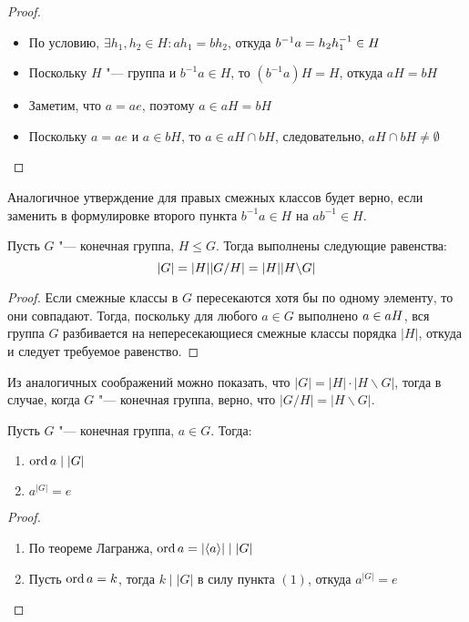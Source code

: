 \begin{proof}~
	\begin{itemize}
		\item{} По условию, $\exists h_1, h_2 \in H: ah_1 = bh_2$, откуда $b^{-1}a \hm= h_2h_1^{-1} \in H$
		\item{} Поскольку $H$ "--- группа и $b^{-1}a \in H$, то $(b^{-1}a)H = H$, откуда $aH = bH$
		\item{} Заметим, что $a = ae$, поэтому $a \in aH = bH$
		\item{} Поскольку $a = ae$ и $a \in bH$, то $a \in aH \cap bH$, следовательно, $aH \cap bH \ne \emptyset$\qedhere
	\end{itemize}
\end{proof}

\begin{note}
	Аналогичное утверждение для правых смежных классов будет верно, если заменить в формулировке второго пункта $b^{-1}a \in H$ на $ab^{-1} \in H$.
\end{note}

\begin{theorem}[Лагранжа]
	Пусть $G$ "--- конечная группа, $H \le G$. Тогда выполнены следующие равенства:
	\[|G| = |H||G / H| \hm= |H||H \bs G|\]
\end{theorem}

\begin{proof}
	Если смежные классы в $G$ пересекаются хотя бы по одному элементу, то они совпадают. Тогда, поскольку для любого $a \in G$ выполнено $a \hm\in aH$, вся группа $G$ разбивается на непересекающиеся смежные классы порядка $|H|$, откуда и следует требуемое равенство.
\end{proof}

\begin{note}
	Из аналогичных соображений можно показать, что $|G| = |H|\cdot|H\backslash G|$, тогда в случае, когда $G$ "--- конечная группа, верно, что $|G / H| = |H\backslash G|$.
\end{note}

\begin{corollary}
	Пусть $G$ "--- конечная группа, $a \in G$. Тогда:
	\begin{enumerate}
		\item $\operatorname{ord}{a} \mid |G|$
		\item $a^{|G|} = e$
	\end{enumerate}
\end{corollary}

\begin{proof}~
	\begin{enumerate}
		\item По теореме Лагранжа, $\operatorname{ord}{a} = |\langle a\rangle| \mid |G|$
		\item Пусть $\operatorname{ord}{a} = k$, тогда $k \mid |G|$ в силу пункта $(1)$, откуда $a^{|G|} = e$\qedhere
	\end{enumerate}
\end{proof}

